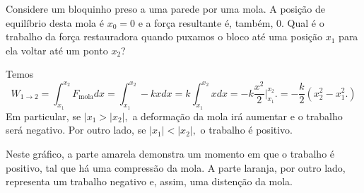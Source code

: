 \documentclass[physics_notes.tex]{subfiles}
\begin{document}
\begin{example}
	Considere um bloquinho preso a uma parede por uma mola. A posição de equilíbrio
	desta mola é \(x_{0}=0\) e a força resultante é, também, 0. Qual é o trabalho
	da força restauradora quando puxamos o bloco até uma posição \(x_{1}\) para ela
	voltar até um ponto \(x_{2}\)?

	Temos
	\[
		W_{1\rightarrow 2} = \int_{x_1}^{x_2}F_{\text{mola}}dx = \int_{x_1}^{x_2} -kxdx =
		k \int_{x_1}^{x_2}xdx = -k \frac{x^{2}}{2}\biggl|_{x_1}^{x_2}\biggr. = -\frac{k}{2}(x_{2}^{2} - x_{1}^{2}.)
	\]
	Em particular, se \(|x_{1} > |x_{2}|,\) a deformação da mola irá aumentar e o trabalho será negativo.
	Por outro lado, se \(|x_{1}| < |x_{2}|, \) o trabalho é positivo.

	Neste gráfico, a parte amarela demonstra um momento em que o trabalho é positivo,
	tal que há uma compressão da mola. A parte laranja, por outro lado, representa um
	trabalho negativo e, assim, uma distenção da mola.
\end{example}
\end{document}
